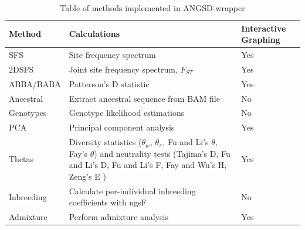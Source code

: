\documentclass[10pt,a4paper]{article}
\newcommand{\fst}{${F_{ST}}$ }
\begin{document}
\begin{table}
\begin{center}
    \begin{tabular}{ | p{3.5cm} | p{5cm} | p{2.5cm}  |}
    \hline
    \textbf{Method} & \textbf{Calculations} & \textbf{Interactive Graphing} \\ \hline \hline
    SFS     &    Site frequency spectrum  & Yes  \\ \hline     2DSFS   &    Joint site frequency spectrum, \fst & Yes  \\ \hline 
    ABBA/BABA  &  Patterson's D statistic & Yes  \\ \hline 
    Ancestral &  Extract ancestral sequence from BAM file  & No \\ \hline 
    Genotypes &  Genotype likelihood estimations & No  \\ \hline 
    PCA     &    Principal component analysis & Yes  \\ \hline 
    Thetas   &   Diversity statistics ($\theta_w$, $\theta_\pi$, Fu and Li's $\theta$, Fay's $\theta$) and neutrality tests (Tajima's D, Fu and Li's D, Fu and Li's F,  Fay and Wu's H, Zeng's E ) & Yes  \\ \hline 
    Inbreeding & Calculate per-individual inbreeding coefficients with ngsF & No  \\ \hline 
    Admixture  & Perform admixture analysis & Yes  \\ \hline 


    \end{tabular}
    \caption{Table of methods implemented in ANGSD-wrapper}
    \label{tab:methods}
    \end{center}
\end{table}
\end{document}
